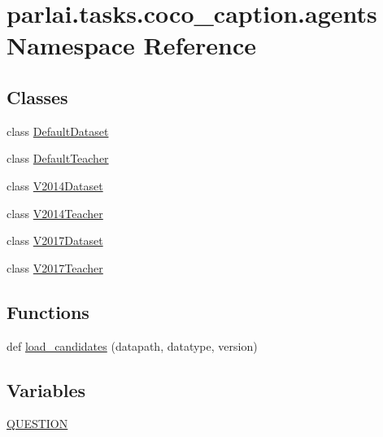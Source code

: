\hypertarget{namespaceparlai_1_1tasks_1_1coco__caption_1_1agents}{}\section{parlai.\+tasks.\+coco\+\_\+caption.\+agents Namespace Reference}
\label{namespaceparlai_1_1tasks_1_1coco__caption_1_1agents}
\subsection*{Classes}
\begin{DoxyCompactItemize}
\item 
class \hyperlink{classparlai_1_1tasks_1_1coco__caption_1_1agents_1_1DefaultDataset}{Default\+Dataset}
\item 
class \hyperlink{classparlai_1_1tasks_1_1coco__caption_1_1agents_1_1DefaultTeacher}{Default\+Teacher}
\item 
class \hyperlink{classparlai_1_1tasks_1_1coco__caption_1_1agents_1_1V2014Dataset}{V2014\+Dataset}
\item 
class \hyperlink{classparlai_1_1tasks_1_1coco__caption_1_1agents_1_1V2014Teacher}{V2014\+Teacher}
\item 
class \hyperlink{classparlai_1_1tasks_1_1coco__caption_1_1agents_1_1V2017Dataset}{V2017\+Dataset}
\item 
class \hyperlink{classparlai_1_1tasks_1_1coco__caption_1_1agents_1_1V2017Teacher}{V2017\+Teacher}
\end{DoxyCompactItemize}
\subsection*{Functions}
\begin{DoxyCompactItemize}
\item 
def \hyperlink{namespaceparlai_1_1tasks_1_1coco__caption_1_1agents_aa190162d0e36e1c93fc224b8a049f0cf}{load\+\_\+candidates} (datapath, datatype, version)
\end{DoxyCompactItemize}
\subsection*{Variables}
\begin{DoxyCompactItemize}
\item 
\hyperlink{namespaceparlai_1_1tasks_1_1coco__caption_1_1agents_ae61e6e5aaf53f888cd2f82bfc492949a}{Q\+U\+E\+S\+T\+I\+ON}
\end{DoxyCompactItemize}



